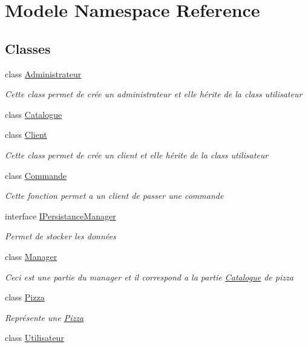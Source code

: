 \hypertarget{namespaceModele}{}\section{Modele Namespace Reference}
\label{namespaceModele}
\subsection*{Classes}
\begin{DoxyCompactItemize}
\item 
class \hyperlink{classModele_1_1Administrateur}{Administrateur}
\begin{DoxyCompactList}\small\item\em Cette class permet de crée un administrateur et elle hérite de la class utilisateur \end{DoxyCompactList}\item 
class \hyperlink{classModele_1_1Catalogue}{Catalogue}
\item 
class \hyperlink{classModele_1_1Client}{Client}
\begin{DoxyCompactList}\small\item\em Cette class permet de crée un client et elle hérite de la class utilisateur \end{DoxyCompactList}\item 
class \hyperlink{classModele_1_1Commande}{Commande}
\begin{DoxyCompactList}\small\item\em Cette fonction permet a un client de passer une commande \end{DoxyCompactList}\item 
interface \hyperlink{interfaceModele_1_1IPersistanceManager}{I\+Persistance\+Manager}
\begin{DoxyCompactList}\small\item\em Permet de stocker les données \end{DoxyCompactList}\item 
class \hyperlink{classModele_1_1Manager}{Manager}
\begin{DoxyCompactList}\small\item\em Ceci est une partie du manager et il correspond a la partie \hyperlink{classModele_1_1Catalogue}{Catalogue} de pizza \end{DoxyCompactList}\item 
class \hyperlink{classModele_1_1Pizza}{Pizza}
\begin{DoxyCompactList}\small\item\em Représente une \hyperlink{classModele_1_1Pizza}{Pizza} \end{DoxyCompactList}\item 
class \hyperlink{classModele_1_1Utilisateur}{Utilisateur}
\end{DoxyCompactItemize}
